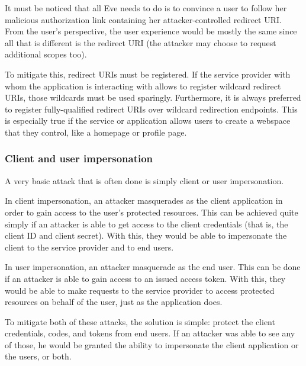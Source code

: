 It must be noticed that all Eve needs to do is to convince a user to follow her malicious authorization link containing her attacker-controlled redirect URI. From the user's perspective, the user experience would be mostly the same since all that is different is the redirect URI (the attacker may choose to request additional scopes too).

To mitigate this, redirect URIs must be registered. If the service provider with whom the application is interacting with allows to register wildcard redirect URIs, those wildcards must be used sparingly. Furthermore, it is always preferred to register fully-qualified redirect URIs over wildcard redirection endpoints. This is especially true if the service or application allows users to create a webspace that they control, like a homepage or profile page.

\subsubsection{Client and user impersonation}
A very basic attack that is often done is simply client or user impersonation.

In client impersonation, an attacker masquerades as the client application in order to gain access to the user's protected resources. This can be achieved quite simply if an attacker is able to get access to the client credentials (that is, the client ID and client secret). With this, they would be able to impersonate the client to the service provider and to end users.

In user impersonation, an attacker masquerade as the end user. This can be done if an attacker is able to gain access to an issued access token. With this, they would be able to make requests to the service provider to access protected resources on behalf of the user, just as the application does.

To mitigate both of these attacks, the solution is simple: protect the client credentials, codes, and tokens from end users. If an attacker was able to see any of those, he would be granted the ability to impersonate the client application or the users, or both.

